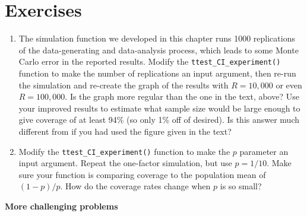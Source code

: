 \documentclass[
]{book}
\begin{document}
\section{Exercises}\label{exercises-1}

\begin{enumerate}
\def\labelenumi{\arabic{enumi}.}
\item
  The simulation function we developed in this chapter runs 1000 replications of the data-generating and data-analysis process, which leads to some Monte Carlo error in the reported results. Modify the \texttt{ttest\_CI\_experiment()} function to make the number of replications an input argument, then re-run the simulation and re-create the graph of the results with \(R=10,000\) or even \(R=100,000\). Is the graph more regular than the one in the text, above?
  Use your improved results to estimate what sample size would be large enough to give coverage of at least 94\% (so only 1\% off of desired).
  Is this answer much different from if you had used the figure given in the text?
\item
  Modify the \texttt{ttest\_CI\_experiment()} function to make the \(p\) parameter an input argument. Repeat the one-factor simulation, but use \(p = 1/10\). Make sure your function is comparing coverage to the population mean of \((1 - p) / p\). How do the coverage rates change when \(p\) is so small?
\end{enumerate}

\textbf{More challenging problems}
\end{document}
